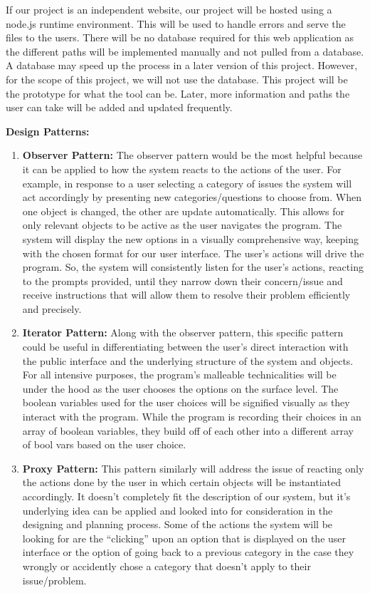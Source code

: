 \documentclass[12pt, letterpaper]{article}
\begin{document}
		If our project is an independent website, our project will be hosted using a node.js runtime environment. This will be used to handle errors and serve the files to the users. There will be no database required for this web application as the different paths will be implemented manually and not pulled from a database. A database may speed up the process in a later version of this project. However, for the scope of this project, we will not use the database. This project will be the prototype for what the tool can be. Later, more information and paths the user can take will be added and updated frequently.
		

	\textbf{Design Patterns:}
	
\begin{enumerate}
	\item \textbf{Observer Pattern:}
	The observer pattern would be the most helpful because it can be applied to how the system reacts to the actions of the user.  For example, in response to a user selecting a category of issues the system will act accordingly by presenting new categories/questions to choose from.  When one object is changed, the other are update automatically. This allows for only relevant objects to be active as the user navigates the program. The system will display the new options in a visually comprehensive way, keeping with the chosen format for our user interface. The user’s actions will drive the program. So, the system will consistently listen for the user’s actions, reacting to the prompts provided, until they narrow down their concern/issue and receive instructions that will allow them to resolve their problem efficiently and precisely.  

	\item \textbf{Iterator Pattern:}
	Along with the observer pattern, this specific pattern could be useful in differentiating between the user’s direct interaction with the public interface and the underlying structure of the system and objects. For all intensive purposes, the program’s malleable technicalities will be under the hood as the user chooses the options on the surface level. The boolean variables used for the user choices will be signified visually as they interact with the program. While the program is recording their choices in an array of boolean variables, they build off of each other into a different array of bool vars based on the user choice. 
	
		\item \textbf{Proxy Pattern:}
	This pattern similarly will address the issue of reacting only the actions done by the user in which certain objects will be instantiated accordingly.  It doesn’t completely fit the description of our system, but it’s underlying idea can be applied and looked into for consideration in the designing and planning process.  Some of the actions the system will be looking for are the “clicking” upon an option that is displayed on the user interface or the option of going back to a previous category in the case they wrongly or accidently chose a category that doesn’t apply to their issue/problem.
	

\end{enumerate}
\end{document}
